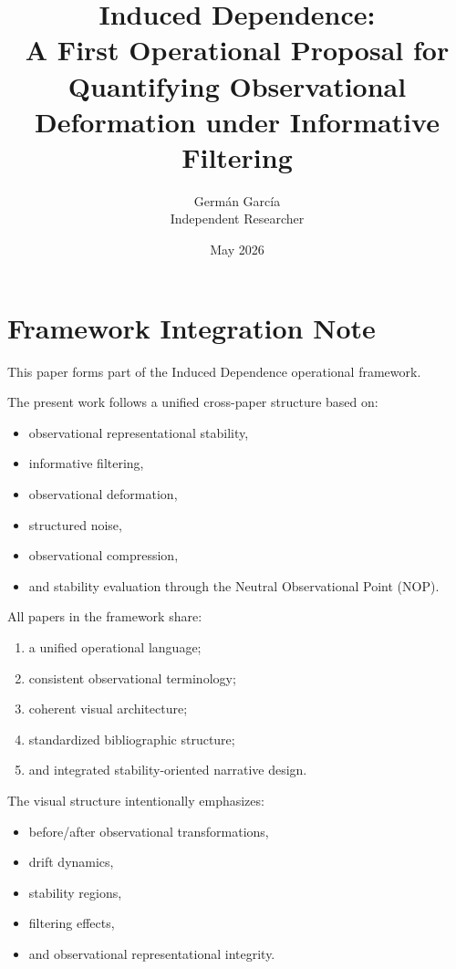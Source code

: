 \documentclass[11pt]{article}
\title{Induced Dependence:\\
A First Operational Proposal for Quantifying Observational Deformation under Informative Filtering}
\author{Germán García\\
Independent Researcher}
\date{May 2026}
\begin{document}

\section*{Framework Integration Note}

This paper forms part of the Induced Dependence operational framework.

The present work follows a unified cross-paper structure based on:
\begin{itemize}
\item observational representational stability,
\item informative filtering,
\item observational deformation,
\item structured noise,
\item observational compression,
\item and stability evaluation through the Neutral Observational Point (NOP).
\end{itemize}

All papers in the framework share:
\begin{enumerate}
\item a unified operational language;
\item consistent observational terminology;
\item coherent visual architecture;
\item standardized bibliographic structure;
\item and integrated stability-oriented narrative design.
\end{enumerate}

The visual structure intentionally emphasizes:
\begin{itemize}
\item before/after observational transformations,
\item drift dynamics,
\item stability regions,
\item filtering effects,
\item and observational representational integrity.
\end{itemize}




\end{document}
